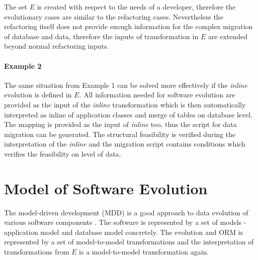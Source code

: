 \documentclass[runningheads]{comsis}
\begin{document}
The set $E$ is created with respect to the needs of a developer, therefore the evolutionary cases are similar to the refactoring cases. Nevertheless the refactoring itself does not provide enough information for the complex migration of database and data, therefore the inputs of transformation in $E$ are extended beyond normal refactoring inputs.

\paragraph{Example 2} The same situation from Example 1 can be solved more effectively if the \emph{inline} evolution is defined in $E$. All information needed for software evolution are provided as the input of the \emph{inline} transformation which is then automatically interpreted as inline of application classes and merge of tables on database level. The mapping is provided as the input of \emph{inline} too, thus the script for data migration can be generated. The structural feasibility is verified during the interpretation of the \emph{inline} and the migration script contains conditions which verifies the feasibility on level of data.





\section{Model of Software Evolution}
\label{sec:models}
The model-driven development (MDD) is a good approach to data evolution of various software components \cite{Moravec:PracticalApproach}. The software is represented by a set of models - application model and database model concretely. The evolution and ORM is represented by a set of model-to-model transformations and the interpretation of transformations from $E$ is a model-to-model transformation again. 
\end{document}
